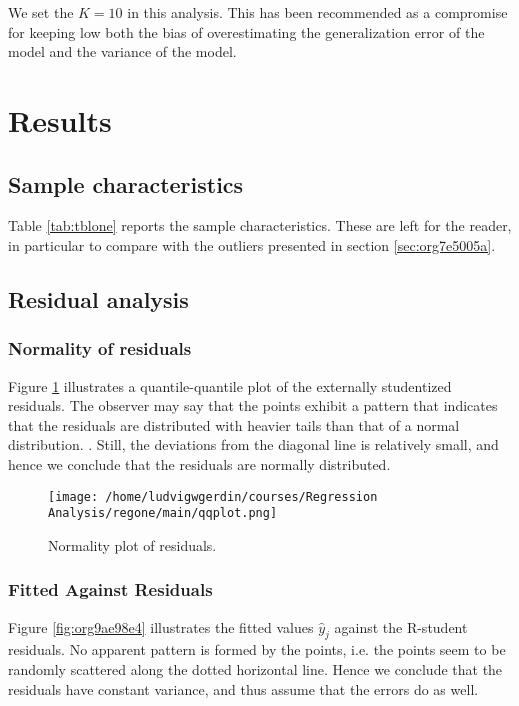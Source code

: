 \documentclass[11pt]{article}
\begin{document}
We set the \(K = 10\) in this analysis. This has been recommended as a compromise for keeping low both the bias of 
overestimating the generalization error of the model and the variance of the model.
\cite{hastie2009elements}

\newpage
\section{Results}
\label{sec:org54c2480}
\subsection{Sample characteristics}
\label{sec:orge94a746}

Table \ref{tab:tblone} reports the sample characteristics. These are left for the reader, in particular to
compare with the outliers presented in section \ref{sec:org7e5005a}.



\subsection{Residual analysis}
\label{sec:org9b7e806}
\subsubsection{Normality of residuals}
\label{sec:org5a55b0d}

Figure \ref{fig:orgf605834} illustrates a quantile-quantile plot of the externally studentized residuals.
The observer may say that the points exhibit a pattern that indicates that the residuals are distributed with
heavier tails than that of a normal distribution. \cite{Montgomery2012}. Still, the deviations from the
diagonal line is relatively small, and hence we conclude that the residuals are normally distributed.

\begin{figure}[htbp]
\centering
\texttt{[image: /home/ludvigwgerdin/courses/Regression Analysis/regone/main/qqplot.png]}
\caption{\label{fig:orgf605834}
Normality plot of residuals.}
\end{figure}

\subsubsection{Fitted Against Residuals}
\label{sec:org58b7006}

Figure \ref{fig:org9ae98e4} illustrates the fitted values \(\hat y_j\) against the R-student residuals. No apparent 
pattern is formed by the points, i.e. the points seem to be randomly scattered along the dotted horizontal
line. Hence we conclude that the residuals have constant variance, and thus assume that the errors do
as well.
\end{document}
